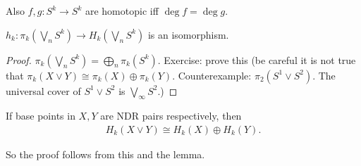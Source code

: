 \documentclass[12pt,class=article,crop=false]{standalone}
\begin{document}
Also $ f,g: S^{k} \to S^{k}$ are homotopic iff $ \deg f = \deg g$.

\begin{coro}
$ h_k: \pi_k( \bigvee_n S^{k} ) \to  H_k( \bigvee_n S^{k})$ is an isomorphism.
\end{coro}
\begin{proof}
$ \pi_k( \bigvee_n S^{k} ) = \bigoplus_{ n} \pi_k(S^{k}) $. Exercise: prove this (be careful it is not true that $ \pi_k(X \vee Y) \cong \pi_k(X) \oplus \pi_k(Y)$. Counterexample: $ \pi_2(S^{1} \vee S^2)$. The universal cover of $ S^{1} \vee S^2$ is $ \bigvee_\infty S^2$.)
\end{proof}
\begin{prop}
If base points in $ X,Y$ are NDR pairs respectively, then
 \begin{align*}
	H_k(X \vee Y) \cong H_k(X) \oplus H_k(Y).
\end{align*}
\end{prop}
So the proof follows from this and the lemma.
\end{document}

